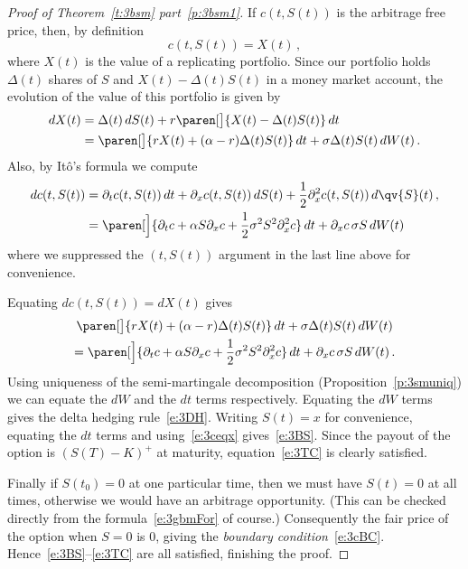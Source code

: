 \begin{proof}[Proof of Theorem~\ref{t:3bsm} part~\ref{p:3bsm1}]
  If $c(t, S(t))$ is the arbitrage free price, then, by definition 
  \begin{equation}\label{e:3ceqx}
    c(t, S(t)) = X(t)\,,
  \end{equation}
  where $X(t)$ is the value of a replicating portfolio.
  Since our portfolio holds $\Delta(t)$ shares of $S$ and $X(t) - \Delta(t) S(t)$ in a money market account, the evolution of the value of this portfolio is given by
  \begin{align*}
    dX(t) &= \Delta(t) \, dS(t) + r \paren[\big]{X(t) - \Delta(t) S(t)} \, dt
    \\
      &= \paren[\big]{ r X(t) + (\alpha - r) \Delta(t) S(t) } \, dt
	+ \sigma \Delta(t) S(t) \, dW(t)\,.
  \end{align*}
  Also, by It\^o's formula we compute
  \begin{align*}
    d c(t, S(t))
      &= \partial_t c(t, S(t)) \, dt + \partial_x c(t, S(t)) \, dS(t) + \frac{1}{2} \partial_x^2 c(t, S(t)) \, d\qv{S}(t)\,,
    \\
      &= \paren[\Big]{\partial_t c + \alpha S \partial_x c + \frac{1}{2} \sigma^2 S^2 \partial_x^2 c} \, dt
	+ \partial_x c\, \sigma S \, dW(t)
  \end{align*}
  where we suppressed the $(t, S(t))$ argument in the last line above for convenience.

  Equating $dc(t, S(t)) = dX(t)$ gives
  \begin{multline*}
    \paren[\big]{ r X(t) + (\alpha - r) \Delta(t) S(t) } \, dt
      + \sigma \Delta(t) S(t) \, dW(t)
    \\
      = \paren[\Big]{\partial_t c + \alpha S \partial_x c + \frac{1}{2} \sigma^2 S^2 \partial_x^2 c} \, dt
	+ \partial_x c\, \sigma S \, dW(t)\,.
  \end{multline*}
  Using uniqueness of the semi-martingale decomposition (Proposition~\ref{p:3smuniq}) we can equate the $dW$ and the $dt$ terms respectively.
  Equating the $dW$ terms gives the delta hedging rule~\eqref{e:3DH}.
  Writing $S(t) = x$ for convenience, equating the $dt$ terms and using~\eqref{e:3ceqx} gives~\eqref{e:3BS}.
  Since the payout of the option is $(S(T) - K)^+$ at maturity, equation~\eqref{e:3TC} is clearly satisfied.

  Finally if $S(t_0) = 0$ at one particular time, then we must have $S(t) = 0$ at all times, otherwise we would have an arbitrage opportunity.
  (This can be checked directly from the formula~\eqref{e:3gbmFor} of course.)
  Consequently the fair price of the option when $S = 0$ is $0$, giving the \emph{boundary condition}~\eqref{e:3cBC}.
  Hence~\eqref{e:3BS}--\eqref{e:3TC} are all satisfied, finishing the proof.
\end{proof}
